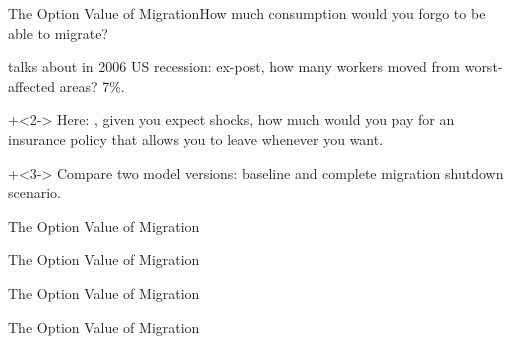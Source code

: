 \documentclass[12pt,english, aspectratio=169]{beamer}
\begin{document}
\begin{frame}{The Option Value of Migration}{How much consumption would you forgo to be able to migrate?}

\begin{midi}
\item \cite{yagan} talks about  in 2006 US recession: ex-post, how many workers moved from worst-affected areas? 7\%.
\item \onslide+<2-> Here: , given you expect shocks, how much would you pay for an insurance policy that allows you to leave whenever you want.
\item \onslide+<3-> Compare two model versions: baseline and complete migration shutdown scenario.
\end{midi}

\end{frame}

\begin{frame}{The Option Value of Migration}

\begin{adjustbox}{center}

\end{adjustbox}

\end{frame}

\begin{frame}{The Option Value of Migration}

\begin{adjustbox}{center}

\end{adjustbox}

\end{frame}
\begin{frame}{The Option Value of Migration}

\begin{adjustbox}{center}

\end{adjustbox}

\end{frame}
\begin{frame}{The Option Value of Migration}

\begin{adjustbox}{center}

\end{adjustbox}

\end{frame}
\end{document}
